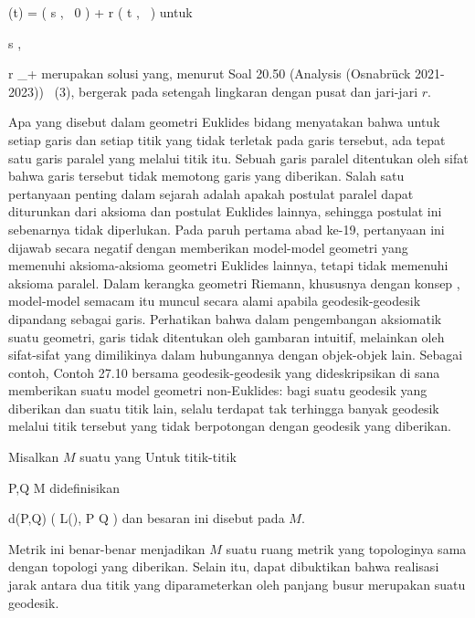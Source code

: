 {\mavergleichskettedisp
{\vergleichskette
{ \gamma(t)
}
{ =} { \left(  s   , \,   0                   \right) + r \left(  \tanh  t   , \,   {  }                   \right)
}
{ } {
}
{ } {
}
{ } {
}
}
{}{}{}
untuk

\mavergleichskette
{\vergleichskette
{ s
}
{ \in }{ \R
}
{  }{
}
{    }{
}
{   }{
}
}
{}{}{,}

\mavergleichskette
{\vergleichskette
{ r
}
{ \in }{ \R_+
}
{  }{
}
{    }{
}
{   }{
}
}
{}{}{}
merupakan solusi yang, menurut
Soal 20.50 (Analysis (Osnabrück 2021-2023))  (3),
bergerak pada setengah lingkaran dengan pusat
 dan jari-jari $r$.

}

{}
{

Apa yang disebut  {}
 {} {}
dalam geometri Euklides bidang menyatakan bahwa untuk setiap garis dan setiap titik yang tidak terletak pada garis tersebut, ada tepat satu garis paralel yang melalui titik itu. Sebuah garis paralel ditentukan oleh sifat bahwa garis tersebut tidak memotong garis yang diberikan. Salah satu pertanyaan penting dalam sejarah adalah apakah postulat paralel dapat diturunkan dari aksioma dan postulat Euklides lainnya, sehingga postulat ini sebenarnya tidak diperlukan. Pada paruh pertama abad ke-19, pertanyaan ini dijawab secara negatif dengan memberikan model-model geometri
 {} {}
yang memenuhi aksioma-aksioma geometri Euklides lainnya, tetapi tidak memenuhi aksioma paralel. Dalam kerangka geometri Riemann, khususnya dengan konsep
,
model-model semacam itu muncul secara alami apabila geodesik-geodesik
 {} {}
dipandang sebagai garis. Perhatikan bahwa dalam pengembangan aksiomatik suatu geometri, garis tidak ditentukan oleh gambaran intuitif, melainkan oleh sifat-sifat yang dimilikinya dalam hubungannya dengan objek-objek lain. Sebagai contoh,
Contoh 27.10
bersama geodesik-geodesik yang dideskripsikan di sana memberikan suatu model geometri non-Euklides: bagi suatu geodesik yang diberikan dan suatu titik lain, selalu terdapat tak terhingga banyak geodesik melalui titik tersebut yang tidak berpotongan dengan geodesik yang diberikan.

}

{}
{

Misalkan $M$ suatu
yang
Untuk titik-titik

\mavergleichskette
{\vergleichskette
{ P,Q
}
{ \in }{ M
}
{  }{
}
{    }{
}
{   }{
}
}
{}{}{}
didefinisikan

\mavergleichskettedisp
{\vergleichskette
{ d(P,Q)
}
{ } {  ( L(\gamma), \gamma {} P  Q  )
}
{ } {
}
{ } {
}
{ } {
}
}
{}{}{}
dan besaran ini disebut
pada $M$.

}

Metrik ini benar-benar menjadikan $M$ suatu ruang metrik yang topologinya sama dengan topologi yang diberikan. Selain itu, dapat dibuktikan bahwa realisasi jarak antara dua titik yang diparameterkan oleh panjang busur merupakan suatu geodesik.
